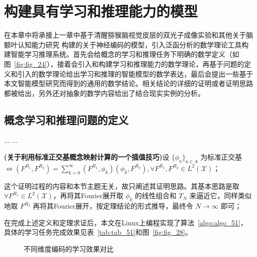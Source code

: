 

\chapter{构建具有学习和推理能力的模型}
\label{cha:intro}

在本章中将承接上一章中基于清醒猕猴脑视觉皮层的双光子成像实验和其他关于脑额叶认知能力研究    构建的关于神经编码的模型，引入泛函分析的数学理论工具构建智能学习推理系统。首先会给概念的学习和推理任务下明确的数学定义（如图~\ref{fig:fig_24}），接着会引入和构建学习和推理能力的数学理论，再基于问题的定义和引入的数学理论给出学习和推理的智能模型的数学表达，最后会提出一些基于本文智能模型研究而得到的通用的数学结论。相关结论的详细的证明或者证明思路都被给出，另外还对抽象的数学内容给出了结合现实实例的分析。

\section{概念学习和推理问题的定义}

... ...

\begin{thm}
\textbf{(关于利用标准正交基概念映射计算的一个插值技巧)}设 $\{ \phi_a \}_{a\in A}$ 为标准正交基 $\iff (F^{R_1},F^{R_2})=\sum_{k=0}^{\infty} (F^{R_1},\phi_k)(\phi_k,F^{R_2}),\forall F^{R_1},F^{R_2} \in L^2(\mathcal{X})$；
\end{thm}


\begin{proof_idea}
这个证明过程的内容和本节主题无关，故只阐述其证明思路。其基本思路是取 $\forall F^{R_1} \in L^2(\mathcal{X})$，再将其Fourier展开取 $\phi_k$ 的线性组合和 $T_N$ 来逼近它，同样类似地取 $F^{R_2}$ 再将其Fourier展开，按定理结论的形式推导，最终令 $N \rightarrow \infty$ 即可；
\end{proof_idea}

在完成上述定义和定理求证后，本文在Linux上编程实现了算法~\ref{algo:algo_51}，具体的学习任务完成效果见表~\ref{tab:tab_51}和图~\ref{fig:fig_28}。


\begin{figure}   
\centering   
{}   
\caption{不同维度编码的学习效果对比}
\label{fig:subfig}
\end{figure}



